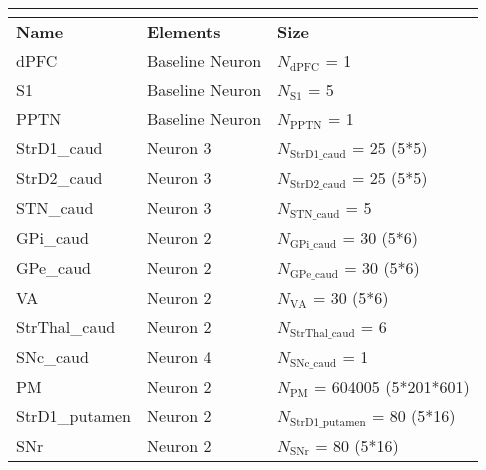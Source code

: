 \documentclass{article}
\newcommand{\hdr}[3]{
    \multicolumn{#1}{|l|}{
        \color{white}\cellcolor[gray]{0.0}
        \textbf{\makebox[0pt]{#2}\hspace{0.5\linewidth}\makebox[0pt][c]{#3}}
    }
}
\begin{document}
\noindent
\begin{tabularx}{\linewidth}{|l|l|X|}\hline
\hdr{3}{B}{Populations}\\ \hline
    \textbf{Name}   & \textbf{Elements} & \textbf{Size} \\ \hline

    dPFC             & Baseline Neuron        & $N_{\text{dPFC}}$ = 1  \\ \hline

    S1             & Baseline Neuron        & $N_{\text{S1}}$ = 5  \\ \hline

    PPTN             & Baseline Neuron        & $N_{\text{PPTN}}$ = 1  \\ \hline

    StrD1\_caud             & Neuron 3        & $N_{\text{StrD1\_caud}}$ = 25 (5*5)  \\ \hline

    StrD2\_caud             & Neuron 3        & $N_{\text{StrD2\_caud}}$ = 25 (5*5)  \\ \hline

    STN\_caud             & Neuron 3        & $N_{\text{STN\_caud}}$ = 5  \\ \hline

    GPi\_caud             & Neuron 2        & $N_{\text{GPi\_caud}}$ = 30 (5*6)  \\ \hline

    GPe\_caud             & Neuron 2        & $N_{\text{GPe\_caud}}$ = 30 (5*6)  \\ \hline

    VA             & Neuron 2        & $N_{\text{VA}}$ = 30 (5*6)  \\ \hline

    StrThal\_caud             & Neuron 2        & $N_{\text{StrThal\_caud}}$ = 6  \\ \hline

    SNc\_caud             & Neuron 4        & $N_{\text{SNc\_caud}}$ = 1  \\ \hline

    PM             & Neuron 2        & $N_{\text{PM}}$ = 604005 (5*201*601)  \\ \hline

    StrD1\_putamen             & Neuron 2        & $N_{\text{StrD1\_putamen}}$ = 80 (5*16)  \\ \hline

    SNr             & Neuron 2        & $N_{\text{SNr}}$ = 80 (5*16)  \\ \hline


\end{tabularx}
\end{document}
